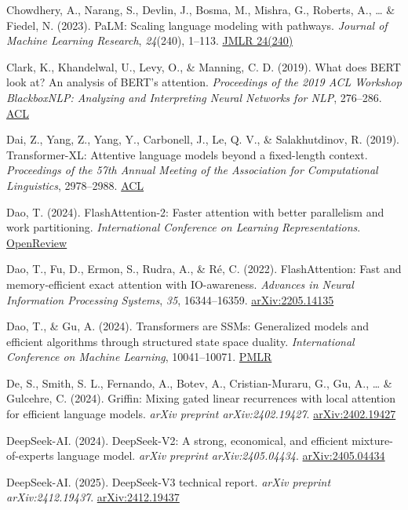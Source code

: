 \documentclass[10pt,twocolumn]{article}
\begin{document}
Chowdhery, A., Narang, S., Devlin, J., Bosma, M., Mishra, G., Roberts, A., \ldots{} \& Fiedel, N. (2023). PaLM: Scaling language modeling with pathways. \emph{Journal of Machine Learning Research}, \emph{24}(240), 1--113. \href{https://jmlr.org/papers/v24/22-1144.html}{JMLR 24(240)}

Clark, K., Khandelwal, U., Levy, O., \& Manning, C. D. (2019). What does BERT look at? An analysis of BERT's attention. \emph{Proceedings of the 2019 ACL Workshop BlackboxNLP: Analyzing and Interpreting Neural Networks for NLP}, 276--286. \href{https://aclanthology.org/W19-4828}{ACL}

Dai, Z., Yang, Z., Yang, Y., Carbonell, J., Le, Q. V., \& Salakhutdinov, R. (2019). Transformer-XL: Attentive language models beyond a fixed-length context. \emph{Proceedings of the 57th Annual Meeting of the Association for Computational Linguistics}, 2978--2988. \href{https://aclanthology.org/P19-1285}{ACL}

Dao, T. (2024). FlashAttention-2: Faster attention with better parallelism and work partitioning. \emph{International Conference on Learning Representations}. \href{https://openreview.net/forum?id=mZn2Xyh9Ec}{OpenReview}

Dao, T., Fu, D., Ermon, S., Rudra, A., \& Ré, C. (2022). FlashAttention: Fast and memory-efficient exact attention with IO-awareness. \emph{Advances in Neural Information Processing Systems}, \emph{35}, 16344--16359. \href{https://arxiv.org/abs/2205.14135}{arXiv:2205.14135}

Dao, T., \& Gu, A. (2024). Transformers are SSMs: Generalized models and efficient algorithms through structured state space duality. \emph{International Conference on Machine Learning}, 10041--10071. \href{https://proceedings.mlr.press/v235/dao24a.html}{PMLR}

De, S., Smith, S. L., Fernando, A., Botev, A., Cristian-Muraru, G., Gu, A., \ldots{} \& Gulcehre, C. (2024). Griffin: Mixing gated linear recurrences with local attention for efficient language models. \emph{arXiv preprint arXiv:2402.19427}. \href{https://arxiv.org/abs/2402.19427}{arXiv:2402.19427}

DeepSeek-AI. (2024). DeepSeek-V2: A strong, economical, and efficient mixture-of-experts language model. \emph{arXiv preprint arXiv:2405.04434}. \href{https://arxiv.org/abs/2405.04434}{arXiv:2405.04434}

DeepSeek-AI. (2025). DeepSeek-V3 technical report. \emph{arXiv preprint arXiv:2412.19437}. \href{https://arxiv.org/abs/2412.19437}{arXiv:2412.19437}
\end{document}
